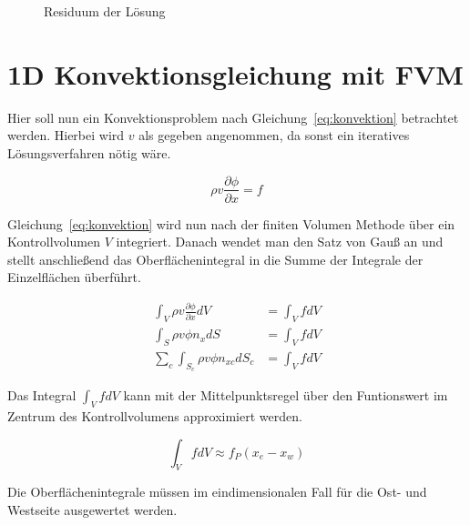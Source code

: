 \documentclass[11pt, ngerman,colorback,accentcolor=tud2d]{tudreport}
\begin{document}
\begin{figure}
\caption{Residuum der Lösung}
\end{figure}


\chapter{1D Konvektionsgleichung mit FVM}
\label{chap:1D Konvektionsgleichung mit FVM}

Hier soll nun ein Konvektionsproblem nach Gleichung~\ref{eq:konvektion} betrachtet
werden. Hierbei wird $v$ als gegeben angenommen, da sonst ein iteratives
Lösungsverfahren nötig wäre.

\begin{equation}
  \rho v \frac{\partial \phi}{\partial x} = f
  \label{eq:konvektion}
\end{equation}

Gleichung~\ref{eq:konvektion} wird nun nach der finiten Volumen Methode über ein
Kontrollvolumen $V$ integriert. Danach wendet man den Satz von Gauß an und stellt
anschließend das Oberflächenintegral in die Summe der Integrale der Einzelflächen
überführt.

\begin{align}
  \int_V \rho v \frac{\partial \phi}{\partial x} dV &= \int_V f dV \nonumber \\
  \int_S \rho v \phi n_x dS &=\int_V f dV \nonumber\\
  \sum_c \int_{S_c} \rho v \phi n_{xc} dS_c &=\int_V f dV \label{eq:base_conv_ready}
\end{align}

Das Integral $\int_V f dV$ kann mit der Mittelpunktsregel über den Funtionswert
im Zentrum des Kontrollvolumens approximiert werden.

\begin{equation}
  \int_V f dV \approx f_P (x_e-x_w) \label{eq:source_term}
\end{equation}

Die Oberflächenintegrale müssen im eindimensionalen Fall für die Ost- und Westseite
ausgewertet werden.
\end{document}
